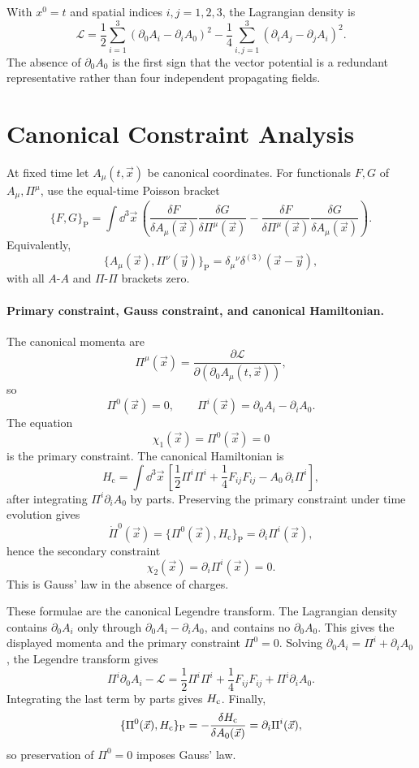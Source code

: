 With \(x^0=t\) and spatial indices \(i,j=1,2,3\), the Lagrangian density is
\[
  \mathcal L
  =
  \frac12\sum_{i=1}^3(\partial_0A_i-\partial_iA_0)^2
  -
  \frac14\sum_{i,j=1}^3(\partial_iA_j-\partial_jA_i)^2 .
\]
The absence of \(\partial_0A_0\) is the first sign that the vector
potential is a redundant representative rather than four independent
propagating fields.

\section{Canonical Constraint Analysis}

\begin{definition}
\label{def:maxwell-canonical-poisson-structure}
At fixed time let \(A_\mu(t,\vec x)\) be canonical coordinates. For
functionals \(F,G\) of \(A_\mu,\Pi^\mu\), use the equal-time Poisson bracket
\[
  \{F,G\}_{\mathrm P}
  =
  \int\dd^3\vec x\,
  \left(
    \frac{\delta F}{\delta A_\mu(\vec x)}
    \frac{\delta G}{\delta\Pi^\mu(\vec x)}
    -
    \frac{\delta F}{\delta\Pi^\mu(\vec x)}
    \frac{\delta G}{\delta A_\mu(\vec x)}
  \right).
\]
Equivalently,
\[
  \{A_\mu(\vec x),\Pi^\nu(\vec y)\}_{\mathrm P}
  =
  \delta_\mu{}^\nu\delta^{(3)}(\vec x-\vec y),
\]
with all \(A\)-\(A\) and \(\Pi\)-\(\Pi\) brackets zero.
\end{definition}

\paragraph{Primary constraint, Gauss constraint, and canonical Hamiltonian.}
The canonical momenta are
\[
  \Pi^\mu(\vec x)
  =
  \frac{\partial\mathcal L}
       {\partial(\partial_0A_\mu(t,\vec x))},
\]
so
\[
  \Pi^0(\vec x)=0,
  \qquad
  \Pi^i(\vec x)=\partial_0A_i-\partial_iA_0 .
\]
The equation
\[
  \chi_1(\vec x)=\Pi^0(\vec x)=0
\]
is the primary constraint. The canonical Hamiltonian is
\[
  H_{\mathrm c}
  =
  \int\dd^3\vec x\,
  \left[
    \frac12\Pi^i\Pi^i
    +
    \frac14F_{ij}F_{ij}
    -
    A_0\,\partial_i\Pi^i
  \right],
\]
after integrating \(\Pi^i\partial_iA_0\) by parts. Preserving the primary
constraint under time evolution gives
\[
  \dot\Pi^0(\vec x)
  =
  \{\Pi^0(\vec x),H_{\mathrm c}\}_{\mathrm P}
  =
  \partial_i\Pi^i(\vec x),
\]
hence the secondary constraint
\[
  \chi_2(\vec x)=\partial_i\Pi^i(\vec x)=0 .
\]
This is Gauss' law in the absence of charges.

These formulae are the canonical Legendre transform.  The Lagrangian density
contains \(\partial_0A_i\) only through
\(\partial_0A_i-\partial_iA_0\), and contains no \(\partial_0A_0\).  This
gives the displayed momenta and the primary constraint \(\Pi^0=0\).  Solving
\(\partial_0A_i=\Pi^i+\partial_iA_0\), the Legendre transform gives
\[
  \Pi^i\partial_0A_i-\mathcal L
  =
  \frac12\Pi^i\Pi^i+\frac14F_{ij}F_{ij}+\Pi^i\partial_iA_0 .
\]
Integrating the last term by parts gives \(H_{\rm c}\).  Finally,
\[
  \{\Pi^0(\vec x),H_{\rm c}\}_{\rm P}
  =
  -\frac{\delta H_{\rm c}}{\delta A_0(\vec x)}
  =
  \partial_i\Pi^i(\vec x),
\]
so preservation of \(\Pi^0=0\) imposes Gauss' law.


